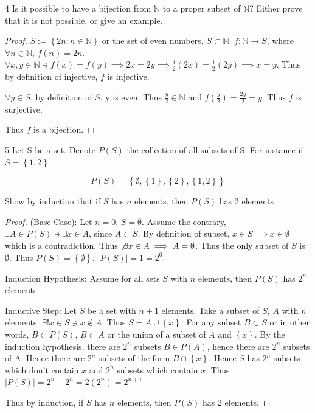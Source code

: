 \documentclass{article}
\newcommand{\N}{\mathbb{N}}
\begin{document}
\begin{PROB}{4}\label{Problem 4.}
    Is it possible to have a bijection from $\N$ to a proper subset of $\N$? Either prove that it is not possible, or give an example.
\end{PROB}
\begin{proof}
    $S := \left\{ 2n : n \in \N \right\}$ or the set of even numbers. $S \subset \N$. $f: \N \to S$, where $\forall n \in \N$, $f(n) = 2n$. $\forall x, y \in \N \ni f(x) = f(y) \implies 2x = 2y \implies \frac{1}{2}(2x) = \frac{1}{2}(2y) \implies x = y$. Thus by definition of injective, $f$ is injective. 
    
    $\forall y \in S$, by definition of $S$, y is even. Thus $\frac{y}{2} \in \N$ and $f(\frac{y}{2}) = \frac{2y}{2} = y$. Thus $f$ is surjective. 
    
    Thus $f$ is a bijection.            
\end{proof}

\bigskip

\begin{claim}{5}\label{Claim 5.}
    Let S be a set. Denote $P(S)$ the collection of all subsets of S. For instance if $S = \left\{ 1, 2 \right\}$

    \[
        P(S) = \left\{ \emptyset, \left\{ 1 \right\}, \left\{ 2 \right\}, \left\{ 1, 2 \right\} \right\}
    \]

    Show by induction that if $S$ has $n$ elements, then $P(S)$ has 2 elements.
\end{claim}
\begin{proof}
    (Base Case): Let $n = 0$, $S = \emptyset$. Assume the contrary, $\exists A \in P(S) \ni \exists x \in A$, since $A \subset S$. By definition of subset, $x \in S \implies x \in \emptyset$ which is a contradiction. Thus $\not \exists x \in A \implies A = \emptyset$. Thus the only subset of $S$ is $\emptyset$. Thus $P(S) = \left\{ \emptyset \right\}$. $|P(S)| = 1 = 2^0$.
    
    Induction Hypothesis: Assume for all sets $S$ with $n$ elements, then $P(S)$ has $2^n$ elements.

    Inductive Step: Let $S$ be a set with $n + 1$ elements. Take a subset of $S$, $A$ with $n$ elements. $\exists! x \in S \ni x \not \in A$. Thus $S = A \cup \left\{ x \right\}$. For any subset $B \subset S$ or in other words, $B \subset P(S)$, $B \subset A$ or the union of a subset of $A$ and $\left\{ x \right\}$. By the induction hypothesis, there are $2^n$ subsets $B \in P(A)$, hence there are $2^n$ subsets of A. Hence there are $2^n$ subsets of the form $B \cap \left\{ x \right\}$. Hence $S$ has $2^n$ subsets which don't contain $x$ and $2^n$ subsets which contain $x$. Thus $|P(S)| = 2^n + 2^n = 2(2^n) = 2^{n + 1}$
    
    Thus by induction, if $S$ has $n$ elements, then $P(S)$ has 2 elements. 
\end{proof}
\end{document}
